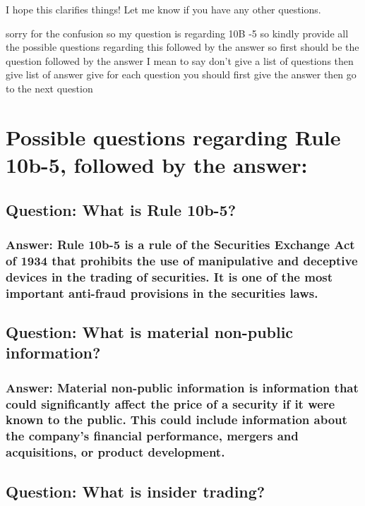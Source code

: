 \documentclass[11pt]{article}
\begin{document}
I hope this clarifies things! Let me know if you have any other questions.

sorry for the confusion so my question is regarding 10B
-5
so kindly provide all the possible questions regarding
this
followed by the answer so first should be the question
followed by the answer I mean to say don't give a list of questions then give list of answer give for each
question you should first give the answer then go to the next question

\section{Possible questions regarding Rule 10b-5, followed by the answer:}
\label{sec:org3e57043}

\subsection{Question: What is Rule 10b-5?}
\label{sec:org216f33e}

\subsubsection{Answer: Rule 10b-5 is a rule of the Securities Exchange Act of 1934 that prohibits the use of manipulative and deceptive devices in the trading of securities. It is one of the most important anti-fraud provisions in the securities laws.}
\label{sec:org54c8867}

\subsection{Question: What is material non-public information?}
\label{sec:orge562fda}

\subsubsection{Answer: Material non-public information is information that could significantly affect the price of a security if it were known to the public. This could include information about the company's financial performance, mergers and acquisitions, or product development.}
\label{sec:org2a3cb30}

\subsection{Question: What is insider trading?}
\label{sec:org2ed4e44}
\end{document}
